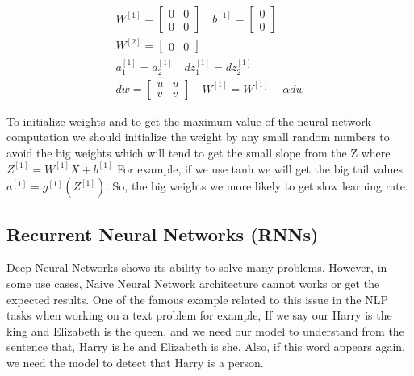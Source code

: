 \begin{subequations}\label{eq:nn_weights_init_zero}
\begin{align}
  W^{[1]} = \begin{bmatrix} 0 & 0\\ 0 & 0 \end{bmatrix} \quad b^{[1]} = \begin{bmatrix} 0 \\ 0 \end{bmatrix} \\
  W^{[2]} = \begin{bmatrix} 0 & 0 \end{bmatrix} \\
  a_1^{[1]} = a_2^{[1]} \quad     dz_1^{[1]} = dz_2^{[1]}\\
  dw = \begin{bmatrix} u & u \\ v & v \end{bmatrix} \quad W^{[1]} = W^{[1]} - \alpha dw
\end{align}
\end{subequations}
     
To initialize weights and to get the maximum value of the neural network computation we should initialize the weight by any small random numbers to avoid the big weights which will tend to get the small slope from the Z where $Z^{[1]}= W^{[1]} X + b^{[1]}$ For example, if we use tanh we will get the big tail values $a^{[1]}= g^{[1]}(Z^{[1]})$. So, the big weights we more likely to get slow learning rate. 
  

\newpage
\subsection{Recurrent Neural Networks (RNNs)}

Deep Neural Networks shows its ability to solve many problems. However, in some use cases, Naive Neural Network architecture cannot works or get the expected results. One of the famous example related to this issue in the NLP tasks when working on a text problem for example, If we say our Harry is the king and Elizabeth is the queen, and we need our model to understand from the sentence that, Harry is he and Elizabeth is she. Also, if this word appears again, we need the model to detect that Harry is a person.


